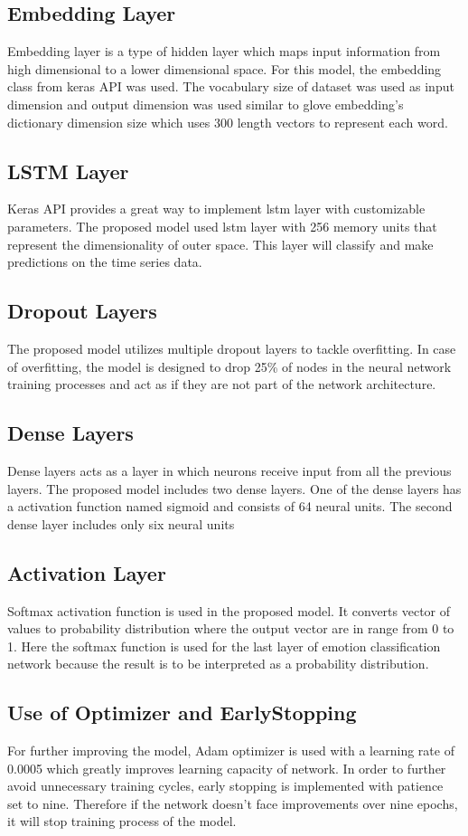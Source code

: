 \subsection{Embedding Layer}
Embedding layer is a type of hidden layer which maps input information from high dimensional to a lower dimensional space. For this model, the embedding class from keras API was used. The vocabulary size of dataset was used as input dimension and output dimension was used similar to glove embedding's dictionary dimension size which uses 300 length vectors to represent each word.
\subsection{LSTM Layer}
Keras API provides a great way to implement lstm layer with customizable parameters. The proposed model used lstm layer with 256 memory units that represent the dimensionality of outer space. This layer will classify and make predictions on the time series data.
\subsection{Dropout Layers}
The proposed model utilizes multiple dropout layers to tackle overfitting. In case of overfitting, the model is designed to drop 25\% of nodes in the neural network training processes and act as if they are not part of the network architecture. 
\subsection{Dense Layers}
Dense layers acts as a layer in which neurons receive input from all the previous layers. The proposed model includes two dense layers. One of the dense layers has a activation function named sigmoid and consists of 64 neural units. The second dense layer includes only six neural units
\subsection{Activation Layer}
Softmax activation function is used in the proposed model. It converts vector of values to probability distribution where the output vector are in range from 0 to 1. Here the softmax function is used for the last layer of emotion classification network because the result is to be interpreted as a probability distribution.

\subsection{Use of Optimizer and EarlyStopping}
For further improving the model, Adam optimizer is used with a learning rate of 0.0005 which greatly improves learning capacity of network. In order to further avoid unnecessary training cycles, early stopping is implemented with patience set to nine. Therefore if the network doesn't face improvements over nine epochs, it will stop training process of the model.
